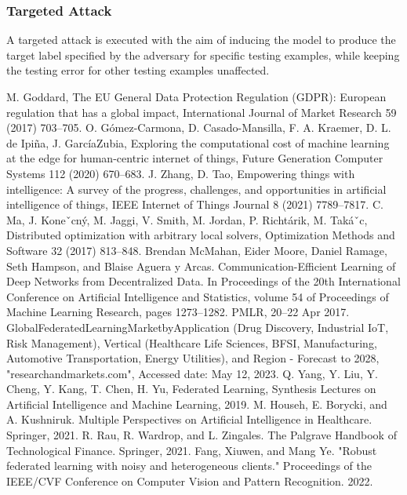 \documentclass[conference]{IEEEtran}
\begin{document}
\subsubsection{Targeted Attack}A targeted attack is executed with 
the aim of inducing the model to produce the target label specified by the 
adversary for specific testing examples, while keeping the testing error for 
other testing examples unaffected.




\begin{thebibliography}{00}
     M. Goddard, The EU General Data Protection Regulation (GDPR): European regulation that has a global impact, International Journal of Market Research 59 (2017) 703–705.
     O. Gómez-Carmona, D. Casado-Mansilla, F. A. Kraemer, D. L. de Ipiña, J. GarcíaZubia, Exploring the computational cost of machine learning at the edge for human-centric internet of things, Future Generation Computer Systems 112 (2020) 670–683.
     J. Zhang, D. Tao, Empowering things with intelligence: A survey of the progress, challenges, and opportunities in artificial intelligence of things, IEEE Internet of Things Journal 8 (2021) 7789–7817.
     C. Ma, J. Koneˇcný, M. Jaggi, V. Smith, M. Jordan, P. Richtárik, M. Takáˇc, Distributed optimization with arbitrary local solvers, Optimization Methods and Software 32 (2017) 813–848.
     Brendan McMahan, Eider Moore, Daniel Ramage, Seth Hampson, and Blaise Aguera y Arcas. Communication-Efficient Learning of Deep Networks from Decentralized Data. In Proceedings of the 20th International Conference on Artificial Intelligence and Statistics, volume 54 of Proceedings of Machine Learning Research, pages 1273–1282. PMLR, 20–22 Apr 2017.
     GlobalFederatedLearningMarketbyApplication (Drug Discovery, Industrial IoT, Risk Management), Vertical (Healthcare  Life Sciences, BFSI, Manufacturing, Automotive Transportation, Energy  Utilities), and Region - Forecast to 2028, "researchandmarkets.com", Accessed date: May 12, 2023.
     Q. Yang, Y. Liu, Y. Cheng, Y. Kang, T. Chen, H. Yu, Federated Learning, Synthesis Lectures on Artificial Intelligence and Machine Learning, 2019.
     M. Househ, E. Borycki, and A. Kushniruk. Multiple Perspectives on Artificial Intelligence in Healthcare. Springer, 2021.
     R. Rau, R. Wardrop, and L. Zingales. The Palgrave Handbook of Technological Finance. Springer, 2021.
     Fang, Xiuwen, and Mang Ye. "Robust federated learning with noisy and heterogeneous clients." Proceedings of the IEEE/CVF Conference on Computer Vision and Pattern Recognition. 2022.

\end{thebibliography}
\end{document}

